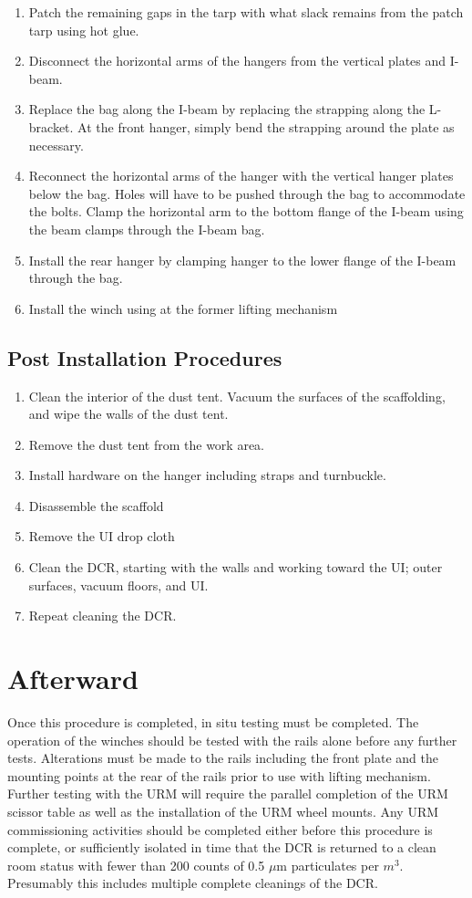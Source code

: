 \documentclass[11pt]{article}
\begin{document}
\begin{enumerate}
\item Patch the remaining gaps in the tarp with what slack remains from the patch tarp using hot glue. 
\item Disconnect the horizontal arms of the hangers from the vertical plates and I-beam.  
\item Replace the bag along the I-beam by replacing the strapping along the L-bracket. At the front hanger, simply bend the strapping around the plate as necessary.
\item Reconnect the horizontal arms of the hanger with the vertical hanger plates below the bag. Holes will have to be pushed through the bag to accommodate the bolts. Clamp the horizontal arm to the bottom flange of the I-beam using the beam clamps through the I-beam bag.
\item Install the rear hanger by clamping hanger to the lower flange of the I-beam through the bag. 
\item Install the winch using at the former lifting mechanism 
\end{enumerate}

\subsection{Post Installation Procedures}
\begin{enumerate}
\item Clean the interior of the dust tent. Vacuum the surfaces of the scaffolding, and wipe the walls of the dust tent. 
\item Remove the dust tent from the work area.
\item Install hardware on the hanger including straps and turnbuckle.
\item Disassemble the scaffold
\item Remove the UI drop cloth
\item Clean the DCR, starting with the walls and working toward the UI; outer surfaces, vacuum floors, and UI.
\item Repeat cleaning the DCR.
\end{enumerate}

\section{Afterward}

Once this procedure is completed, in situ testing must be completed. The operation of the winches should be tested with the rails alone before any further tests. Alterations must be made to the rails including the front plate and the mounting points at the rear of the rails prior to use with lifting mechanism.  Further testing with the URM will require the parallel completion of the URM scissor table as well as the installation of the URM wheel mounts. Any URM commissioning activities should be completed either before this procedure is complete, or sufficiently isolated in time that the DCR is returned to a clean room status with fewer than 200 counts of 0.5 $\mu$m particulates per $m^{3}$. Presumably this includes multiple complete cleanings of the DCR.
\end{document}
